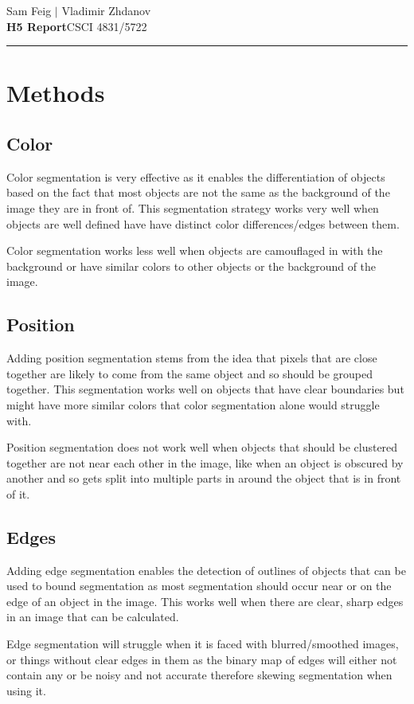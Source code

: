 \documentclass[12pt]{article}
\begin{document}
\hfill Sam Feig $|$ Vladimir Zhdanov \\
\textbf{H5 Report}\hfill CSCI 4831/5722 \\
\rule{\textwidth}{.75pt}

\section{Methods}
\subsection{Color}
	Color segmentation is very effective as it enables the differentiation of objects based on the fact that most objects are not the same as the background of the image they are in front of. This segmentation strategy works very well when objects are well defined have have distinct color differences/edges between them. 
	
	Color segmentation works less well when objects are camouflaged in with the background or have similar colors to other objects or the background of the image.
	
\subsection{Position}
	Adding position segmentation stems from the idea that pixels that are close together are likely to come from the same object and so should be grouped together. This segmentation works well on objects that have clear boundaries but might have more similar colors that color segmentation alone would struggle with.
	
	Position segmentation does not work well when objects that should be clustered together are not near each other in the image, like when an object is obscured by another and so gets split into multiple parts in around the object that is in front of it.
	
\subsection{Edges}
	Adding edge segmentation enables the detection of outlines of objects that can be used to bound segmentation as most segmentation should occur near or on the edge of an object in the image. This works well when there are clear, sharp edges in an image that can be calculated.
	
	Edge segmentation will struggle when it is faced with blurred/smoothed images, or things without clear edges in them as the binary map of edges will either not contain any or be noisy and not accurate therefore skewing segmentation when using it.
\end{document}
